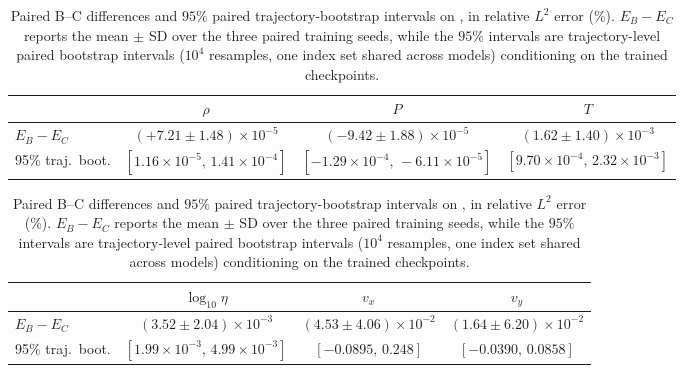 \begin{table}[H]
\centering
\small
\caption{Paired B--C differences and $95\%$ paired trajectory-bootstrap
intervals on \pone, in relative $L^2$ error (\%). $E_B-E_C$ reports the
mean $\pm$ SD over the three paired training seeds, while the $95\%$
intervals are trajectory-level paired bootstrap intervals ($10^{4}$
resamples, one index set shared across models) conditioning on the trained
checkpoints.}
\label{tab:ablation_stats}
\setlength{\tabcolsep}{4.5pt}
\begin{tabular}{lccc}
\toprule
 & $\rho$ & $P$ & $T$\\
\midrule
$E_B-E_C$ & $(+7.21{\pm}1.48){\times}10^{-5}$ & $(-9.42{\pm}1.88){\times}10^{-5}$ & $(1.62{\pm}1.40){\times}10^{-3}$\\
95\% traj.~boot. & $[1.16{\times}10^{-5},\,1.41{\times}10^{-4}]$ & $[-1.29{\times}10^{-4},\,-6.11{\times}10^{-5}]$ & $[9.70{\times}10^{-4},\,2.32{\times}10^{-3}]$\\
\bottomrule
\end{tabular}

\vspace{4pt}

\begin{tabular}{lccc}
\toprule
 & $\log_{10}\eta$ & $v_x$ & $v_y$\\
\midrule
$E_B-E_C$ & $(3.52{\pm}2.04){\times}10^{-3}$ & $(4.53{\pm}4.06){\times}10^{-2}$ & $(1.64{\pm}6.20){\times}10^{-2}$\\
95\% traj.~boot. & $[1.99{\times}10^{-3},\,4.99{\times}10^{-3}]$ & $[-0.0895,\,0.248]$ & $[-0.0390,\,0.0858]$\\
\bottomrule
\end{tabular}
\end{table}
